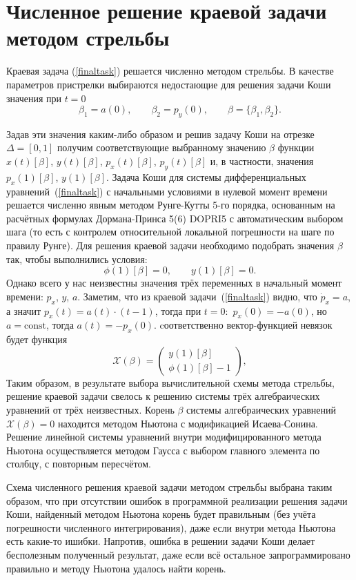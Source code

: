 \section{Численное решение краевой задачи методом стрельбы}
Краевая задача (\ref{finaltask}) решается численно методом стрельбы. В качестве параметров пристрелки выбираются недостающие для решения задачи Коши значения при $t = 0$
\[
\beta_1 = a(0), \qquad \beta_2 = p_y(0), \qquad \beta =\{ \beta_1, \beta_2 \}.
\] 

Задав эти значения каким-либо образом и решив задачу Коши на отрезке $\Delta = [0,1]$ получим соответствующие выбранному значению $\beta$ функции $x(t)[\beta]$, $y(t)[\beta]$, $p_x(t)[\beta]$, $p_y(t)[\beta]$ и, в частности, значения $p_x(1)[\beta]$, $y(1)[\beta]$. Задача Коши для системы дифференциальных уравнений~(\ref{finaltask}) с начальными условиями в нулевой момент времени решается численно явным методом Рунге-Кутты 5-го порядка, основанным на расчётных формулах Дормана-Принса 5(6) DOPRI5 с автоматическим выбором шага (то есть с контролем относительной локальной погрешности на шаге по правилу Рунге). Для решения краевой задачи необходимо подобрать значения $\beta$ так, чтобы выполнились условия:
\[
\phi(1)[\beta] = 0,\qquad y(1)[\beta] = 0.
\]
Однако всего у нас неизвестны значения трёх переменных в начальный момент времени: $p_x$, $y$, $a$. Заметим, что из краевой задачи~(\ref{finaltask}) видно, что $\dot{p}_x = a$, а значит $p_x(t) = a(t) \cdot (t-1)$, тогда при $t = 0 \colon$ $p_x(0) = -a(0)$, но $a = \mathrm{const}$, тогда $a(t) = -p_x(0)$.
cоответственно вектор-функцией невязок будет функция 
\[
\mathcal{X}(\beta) = 
\begin{pmatrix}
y(1)[\beta] \\
\phi(1)[\beta]-1
\end{pmatrix},
\]
Таким образом, в результате выбора вычислительной схемы метода стрельбы, решение краевой задачи свелось к решению системы трёх алгебраических уравнений от трёх неизвестных. Корень $\beta$ системы алгебраических уравнений $\mathcal{X}(\beta) = 0$ находится методом Ньютона с модификацией Исаева-Сонина. Решение линейной системы уравнений внутри модифицированного метода Ньютона осуществляется методом Гаусса с выбором главного элемента по столбцу, с повторным пересчётом.

Схема численного решения краевой задачи методом стрельбы выбрана таким образом, что при отсутствии ошибок в программной реализации решения задачи Коши, найденный методом Ньютона корень будет правильным (без учёта погрешности численного интегрирования), даже если внутри метода Ньютона есть какие-то ишибки. Напротив, ошибка в решении задачи Коши делает бесполезным полученный результат, даже если всё остальное запрограммировано правильно и методу Ньютона удалось найти корень.

